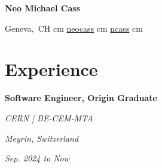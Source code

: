 \documentclass[10pt, letterpaper]{article}
\newenvironment{twocolentry}[2][]{
    \onecolentry
    \def\secondColumn{#2}
    \setcolumnwidth{\fill, 4.5 cm}
    \begin{paracol}{2}
}{
    \switchcolumn \raggedleft \secondColumn
    \end{paracol}
    \endonecolentry
} %
\newenvironment{header}{
    \setlength{\topsep}{0pt}\par\kern\topsep\centering\linespread{1.5}
}{
    \par\kern\topsep
} %
\let\hrefWithoutArrow\href
\renewcommand{\href}[2]{\hrefWithoutArrow{#1}{\mbox{\ifthenelse{\equal{#2}{}}{ }{#2 }\raisebox{.15ex}{\footnotesize \faExternalLink*}}}}
\begin{document}
    \begin{header}
        \textbf{\fontsize{22 pt}{22 pt}\selectfont Neo Michael Cass}

        \vspace{0.3 cm}

        \normalsize
        \mbox{{\color{black}{\footnotesize\faMapMarker*}\hspace*{0.13cm}Geneva, CH}}
         cm
        \mbox{\hrefWithoutArrow{https://linkedin.com/in/neocass}{\color{black}{\footnotesize\faLinkedinIn}\hspace*{0.13cm}neocass}}
         cm
        \mbox{\hrefWithoutArrow{https://gitlab.cern.ch/ncass}{\color{black}{\footnotesize\faGitlab}\hspace*{0.13cm}ncass}}
         cm
    \end{header}

    \vspace{- 0.0 cm}

    \section{Experience}


        \begin{twocolentry}{
        \textit{Meyrin, Switzerland}    
            
        \textit{Sep. 2024 to Now}}
            \textbf{Software Engineer, Origin Graduate}
            
            \textit{CERN | BE-CEM-MTA}
        \end{twocolentry}

        \vspace{0.10 cm-3px}
        
\end{document}

